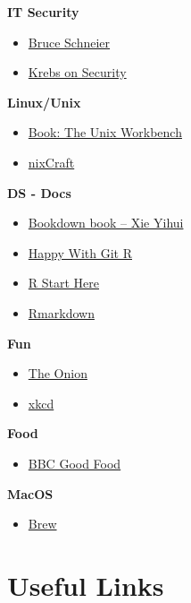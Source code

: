 \documentclass[]{book}
\providecommand{\tightlist}{%
  \setlength{\itemsep}{0pt}\setlength{\parskip}{0pt}}
\theoremstyle{definition}
\theoremstyle{definition}
\theoremstyle{definition}
\theoremstyle{remark}
\begin{document}
\textbf{IT Security}

\begin{itemize}
\tightlist
\item
  \href{https://www.schneier.com/}{Bruce Schneier}
\item
  \href{https://krebsonsecurity.com/}{Krebs on Security}
\end{itemize}

\textbf{Linux/Unix}

\begin{itemize}
\tightlist
\item
  \href{http://seankross.com/the-unix-workbench/}{Book: The Unix
  Workbench}
\item
  \href{https://www.cyberciti.biz/}{nixCraft}
\end{itemize}

\textbf{DS - Docs}

\begin{itemize}
\tightlist
\item
  \href{https://bookdown.org/yihui/bookdown/}{Bookdown book -- Xie
  Yihui}
\item
  \href{http://happygitwithr.com/}{Happy With Git R}
\item
  \href{https://github.com/rstudio/RStartHere}{R Start Here}
\item
  \href{https://bookdown.org/yihui/rmarkdown/}{Rmarkdown}
\end{itemize}

\textbf{Fun}

\begin{itemize}
\tightlist
\item
  \href{https://www.theonion.com/}{The Onion}
\item
  \href{https://xkcd.org/}{xkcd}
\end{itemize}

\textbf{Food}

\begin{itemize}
\tightlist
\item
  \href{https://www.bbcgoodfood.com}{BBC Good Food}
\end{itemize}

\textbf{MacOS}

\begin{itemize}
\tightlist
\item
  \href{https://brew.sh/}{Brew}
\end{itemize}

\chapter{Useful Links}\label{Links}
\end{document}
